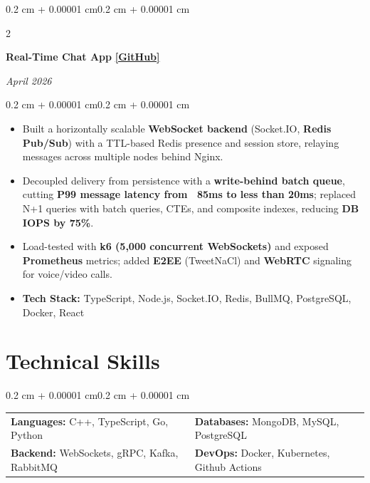 \documentclass[10pt, letterpaper]{article}
\newenvironment{highlights}{
    \begin{itemize}[
        topsep=0.06 cm,
        parsep=0.06 cm,
        partopsep=0pt,
        itemsep=0pt,
        leftmargin=0.4 cm + 10pt
    ]
}{
    \end{itemize}
}
\newenvironment{onecolentry}{
    \begin{adjustwidth}{0.2 cm + 0.00001 cm}{0.2 cm + 0.00001 cm}
}{
    \end{adjustwidth}
}
\newenvironment{twocolentry}[2][]{
    \onecolentry
    \def\secondColumn{#2}
    \setcolumnwidth{\fill, 4.5 cm}
    \begin{paracol}{2}
}{
    \switchcolumn \raggedleft \secondColumn
    \end{paracol}
    \endonecolentry
}
\let\hrefWithoutArrow\href
\renewcommand{\href}[2]{\hrefWithoutArrow{#1}{\ifthenelse{\equal{#2}{}}{ }{#2 }\raisebox{.15ex}{\footnotesize \faExternalLink*}}}
\begin{document}
    \begin{twocolentry}{\textit{April 2026}}
        \textbf{Real-Time Chat App} \quad
        \hrefWithoutArrow{https://github.com/AkshatRauthan/real-time-chat-app}{\textbf{[GitHub]}}
    \end{twocolentry}
    \vspace{0.10 cm}
    \begin{onecolentry}
        \begin{highlights}
            \item Built a horizontally scalable \textbf{WebSocket backend} (Socket.IO, \textbf{Redis Pub/Sub}) with a TTL-based Redis presence and session store, 
                relaying messages across multiple nodes behind Nginx.
            \item Decoupled delivery from persistence with a \textbf{write-behind batch queue}, cutting \textbf{P99 message latency from ~85ms to less than 20ms}; replaced 
                N+1 queries with batch queries, CTEs, and composite indexes, reducing \textbf{DB IOPS by 75\%}.
            \item Load-tested with \textbf{k6 (5,000 concurrent WebSockets)} and exposed \textbf{Prometheus} metrics; added \textbf{E2EE} (TweetNaCl) and 
                \textbf{WebRTC} signaling for voice/video calls.
            \item \textbf{Tech Stack:} TypeScript, Node.js, Socket.IO, Redis, BullMQ, PostgreSQL, Docker, React
        \end{highlights}
    \end{onecolentry}



\section{Technical Skills}

    \begin{onecolentry}
        \renewcommand{\arraystretch}{1.2}
        \begin{tabularx}{\textwidth}{@{} X X @{}}
            \textbf{Languages:} C++, TypeScript, Go, Python 
            & 
            \textbf{Databases:} MongoDB, MySQL, PostgreSQL \\
            
            
            \textbf{Backend:} WebSockets, gRPC, Kafka, RabbitMQ
            &
            \textbf{DevOps:} Docker, Kubernetes, Github Actions \\
        \end{tabularx}
    \end{onecolentry}
\vspace{0.1cm}
\end{document}
